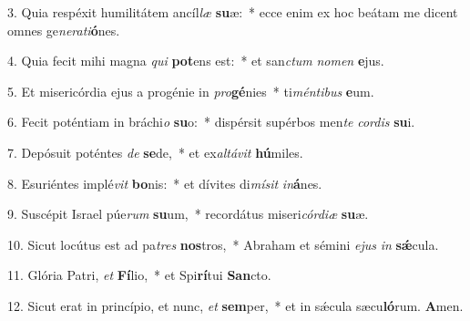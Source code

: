 \item 3. Quia respéxit humilitátem ancíl\textit{læ} \textbf{su}æ:~* ecce enim ex hoc beátam me dicent omnes ge\textit{nerati}\textbf{ó}nes.
\item 4. Quia fecit mihi magna \textit{qui} \textbf{pot}ens est:~* et san\textit{ctum} \textit{nomen} \textbf{e}jus.
\item 5. Et misericórdia ejus a progénie in \textit{pro}\textbf{gé}nies~* ti\textit{méntibus} \textbf{e}um.
\item 6. Fecit poténtiam in bráchi\textit{o} \textbf{su}o:~* dispérsit supérbos men\textit{te} \textit{cordis} \textbf{su}i.
\item 7. Depósuit poténtes \textit{de} \textbf{se}de,~* et ex\textit{altávit} \textbf{hú}miles.
\item 8. Esuriéntes implé\textit{vit} \textbf{bo}nis:~* et dívites di\textit{mísit} \textit{in}\textbf{á}nes.
\item 9. Suscépit Israel púe\textit{rum} \textbf{su}um,~* recordátus miseri\textit{córdiæ} \textbf{su}æ.
\item 10. Sicut locútus est ad pa\textit{tres} \textbf{nos}tros,~* Abraham et sémini \textit{ejus} \textit{in} \textbf{sǽ}cula.
\item 11. Glória Patri, \textit{et} \textbf{Fí}lio,~* et Spi\textbf{rí}tui \textbf{San}cto.
\item 12. Sicut erat in princípio, et nunc, \textit{et} \textbf{sem}per,~* et in sǽcula sæcu\hspace{0.03em}\textbf{ló}rum. \textbf{A}men.
